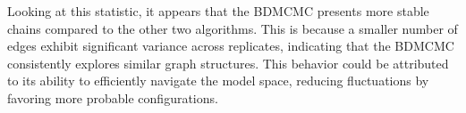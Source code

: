 \documentclass{report}
\begin{document}
Looking at this statistic, it appears that the BDMCMC presents more stable chains compared to the other two algorithms. This is because a smaller number of edges exhibit significant variance across replicates, indicating that the BDMCMC consistently explores similar graph structures. This behavior could be attributed to its ability to efficiently navigate the model space, reducing fluctuations by favoring more probable configurations. 

\begin{figure}[!ht]
	\centering
\end{figure}
\end{document}
